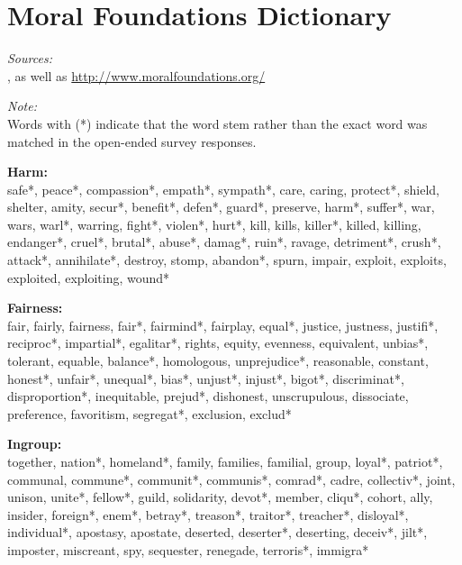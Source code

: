 \documentclass[12pt]{article}
\begin{document}
\clearpage\flushleft\footnotesize\singlespacing
\appendices
\section{Moral Foundations Dictionary}
\renewcommand\thefigure{\thesection.\arabic{figure}}
\renewcommand\thetable{\thesection.\arabic{table}}
\setcounter{figure}{0}
\setcounter{table}{0}

\textit{Sources:}\\
\citet{graham2009liberals}, as well as \url{http://www.moralfoundations.org/}
\vspace{.5cm}

\textit{Note:}\\
Words with (*) indicate that the word stem rather than the exact word was matched in the open-ended survey responses.
\vspace{.5cm}

\textbf{Harm:}\\
safe*, peace*, compassion*, empath*, sympath*, care, caring, protect*, shield, shelter, amity, secur*, benefit*, defen*, guard*, preserve, harm*, suffer*, war, wars, warl*, warring, fight*, violen*, hurt*, kill, kills, killer*, killed, killing, endanger*, cruel*, brutal*, abuse*, damag*, ruin*, ravage, detriment*, crush*, attack*, annihilate*, destroy, stomp, abandon*, spurn, impair, exploit, exploits, exploited, exploiting, wound*
\vspace{.5cm}

\textbf{Fairness:}\\
fair, fairly, fairness, fair*, fairmind*, fairplay, equal*, justice, justness, justifi*, reciproc*, impartial*, egalitar*, rights, equity, evenness, equivalent, unbias*, tolerant, equable, balance*, homologous, unprejudice*, reasonable, constant, honest*, unfair*, unequal*, bias*, unjust*, injust*, bigot*, discriminat*, disproportion*, inequitable, prejud*, dishonest, unscrupulous, dissociate, preference, favoritism, segregat*, exclusion, exclud*
\vspace{.5cm}

\textbf{Ingroup:}\\
together, nation*, homeland*, family, families, familial, group, loyal*, patriot*, communal, commune*, communit*, communis*, comrad*, cadre, collectiv*, joint, unison, unite*, fellow*, guild, solidarity, devot*, member, cliqu*, cohort, ally, insider, foreign*, enem*, betray*, treason*, traitor*, treacher*, disloyal*, individual*, apostasy, apostate, deserted, deserter*, deserting, deceiv*, jilt*, imposter, miscreant, spy, sequester, renegade, terroris*, immigra*
\vspace{.5cm}
\end{document}
